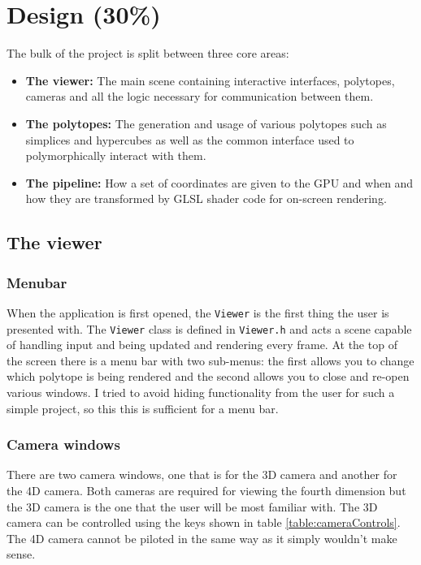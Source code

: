 \documentclass[11pt, a4paper]{article}
\begin{document}
\section{Design (30\%)}

The bulk of the project is split between three core areas:

\begin{itemize}
  \item \textbf{The viewer:} The main scene containing interactive interfaces, polytopes, cameras and all the logic necessary for communication between them.
  \item \textbf{The polytopes:} The generation and usage of various polytopes such as simplices and hypercubes as well as the common interface used to polymorphically interact with them.
  \item \textbf{The pipeline:} How a set of coordinates are given to the GPU and when and how they are transformed by GLSL shader code for on-screen rendering.
\end{itemize}

\subsection{The viewer}

\subsubsection{Menubar}

When the application is first opened, the \texttt{Viewer} is the first thing the user is presented with. The \texttt{Viewer} class is defined in \texttt{Viewer.h} and acts a scene capable of handling input and being updated and rendering every frame. At the top of the screen there is a menu bar with two sub-menus: the first allows you to change which polytope is being rendered and the second allows you to close and re-open various windows. I tried to avoid hiding functionality from the user for such a simple project, so this this is sufficient for a menu bar.

\subsubsection{Camera windows}

There are two camera windows, one that is for the 3D camera and another for the 4D camera. Both cameras are required for viewing the fourth dimension but the 3D camera is the one that the user will be most familiar with. The 3D camera can be controlled using the keys shown in table \ref{table:cameraControls}. The 4D camera cannot be piloted in the same way as it simply wouldn't make sense.
\end{document}

